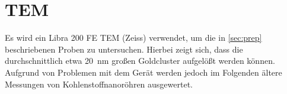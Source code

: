 \newpage
\section{TEM} %

 Es wird ein Libra 200 FE TEM (Zeiss) verwendet, um die in \cref{sec:prep} beschriebenen Proben zu untersuchen.
 Hierbei zeigt sich, dass die durchschnittlich etwa \SI{20}{nm} großen Goldcluster aufgelößt werden können.
 Aufgrund von Problemen mit dem Gerät werden jedoch im Folgenden ältere Messungen von Kohlenstoffnanoröhren ausgewertet.









